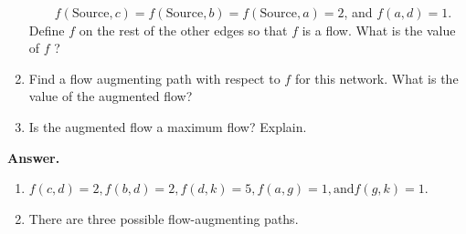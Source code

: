 \documentclass[10pt,]{book}
\theoremstyle{plain}
\theoremstyle{definition}
\theoremstyle{definition}
\theoremstyle{definition}
\theoremstyle{definition}
\theoremstyle{definition}
\numberwithin{equation}{section}
\begin{document}
\begin{exercisegroup}
\begin{enumerate}[label=\alph*]
\(\quad \quad\)\(f(\text{Source}, c) = f(\text{Source}, b) =f(\text{Source}, a) = 2\), and \(f(a, d) = 1\). 
 Define \(f\) on the rest of the other edges so that \(f\) is a flow. What is the value of  \(f\) ?%
\item\hypertarget{li-111}{} Find a flow augmenting path with respect to \(f\) for this network. What is the value of the augmented flow?%
\item\hypertarget{li-112}{} Is the augmented flow a maximum flow? Explain.%
\end{enumerate}
%
\par\smallskip
\par\smallskip
\noindent\textbf{Answer.}\hypertarget{answer-13}{}\quad
\leavevmode%
\begin{enumerate}[label=\alph*]
\item\hypertarget{li-113}{} \(f(c,d)=2, f(b,d)=2, f(d,k)=5, f(a,g)=1, \text{and} f(g,k)=1\).
%
\item\hypertarget{li-114}{}  There are three possible flow-augmenting paths.


\end{enumerate}
\end{exercisegroup}
\end{document}
